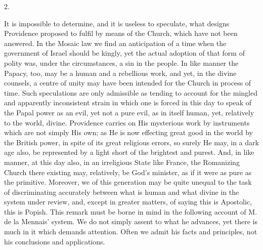 2.

It is impossible to determine, and it is useless
to speculate, what designs Providence proposed to fulfil by means of
the Church, which have not been answered. In the Mosaic law we
find an anticipation of a time when the government of Israel should be
kingly, yet the actual adoption of that form of polity was, under the
circumstances, a sin in the people. In like manner the Papacy, too,
may be a human and a rebellious work, and yet, in the divine counsels,
a centre of unity may have been intended for the Church in process of
time. Such speculations are only admissible as tending to account for
the mingled and apparently inconsistent strain in which one is forced
in this day to speak of the Papal power as an evil, yet not a pure
evil, as in itself human, yet, relatively to the world, divine.
Providence carries on His mysterious work by instruments which are not
simply His own; as He is now effecting great good in the world by the
British power, in spite of its great religious errors, so surely He
may, in a dark age also, be represented by a light short of the
brightest and purest. And, in like manner, at this day also, in an
irreligious State like France, the Romanizing Church there existing
may, relatively, be God's minister, as if it were as pure as the
primitive. Moreover, we of this generation may be quite unequal to the
task of discriminating accurately between what is human and what
divine in the system under review, and, except in greater matters, of
saying this is Apostolic, this is Popish. This remark must be borne in
mind in the following account of M. de la Mennais' system. We do not
simply assent to what he advances, yet there is much in it which
demands attention. Often we admit his facts and principles, not his
conclusions and applications.

